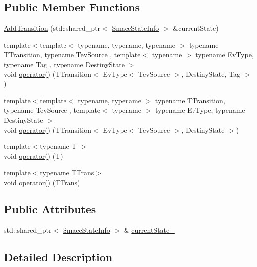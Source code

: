 \subsection*{Public Member Functions}
\begin{DoxyCompactItemize}
\item 
\hyperlink{structsmacc_1_1AddTransition_aaca309ef77d327ac3ac9c45af7d9b902}{Add\+Transition} (std\+::shared\+\_\+ptr$<$ \hyperlink{classsmacc_1_1SmaccStateInfo}{Smacc\+State\+Info} $>$ \&current\+State)
\item 
{\footnotesize template$<$template$<$ typename, typename, typename $>$ typename T\+Transition, typename Tev\+Source , template$<$ typename $>$ typename Ev\+Type, typename Tag , typename Destiny\+State $>$ }\\void \hyperlink{structsmacc_1_1AddTransition_ad5b84d0a9d5975bcbd895310e9d39aa0}{operator()} (T\+Transition$<$ Ev\+Type$<$ Tev\+Source $>$, Destiny\+State, Tag $>$)
\item 
{\footnotesize template$<$template$<$ typename, typename $>$ typename T\+Transition, typename Tev\+Source , template$<$ typename $>$ typename Ev\+Type, typename Destiny\+State $>$ }\\void \hyperlink{structsmacc_1_1AddTransition_afcbe483fb0ee38710ad8861549b3a53c}{operator()} (T\+Transition$<$ Ev\+Type$<$ Tev\+Source $>$, Destiny\+State $>$)
\item 
{\footnotesize template$<$typename T $>$ }\\void \hyperlink{structsmacc_1_1AddTransition_a4d4ece2e48045d830fc924b094522d36}{operator()} (T)
\item 
{\footnotesize template$<$typename T\+Trans$>$ }\\void \hyperlink{structsmacc_1_1AddTransition_aca537c29c2dad6c0844032dee56b31a9}{operator()} (T\+Trans)
\end{DoxyCompactItemize}
\subsection*{Public Attributes}
\begin{DoxyCompactItemize}
\item 
std\+::shared\+\_\+ptr$<$ \hyperlink{classsmacc_1_1SmaccStateInfo}{Smacc\+State\+Info} $>$ \& \hyperlink{structsmacc_1_1AddTransition_a0fd1d2d424ac74b700a46f8409fc8353}{current\+State\+\_\+}
\end{DoxyCompactItemize}


\subsection{Detailed Description}


